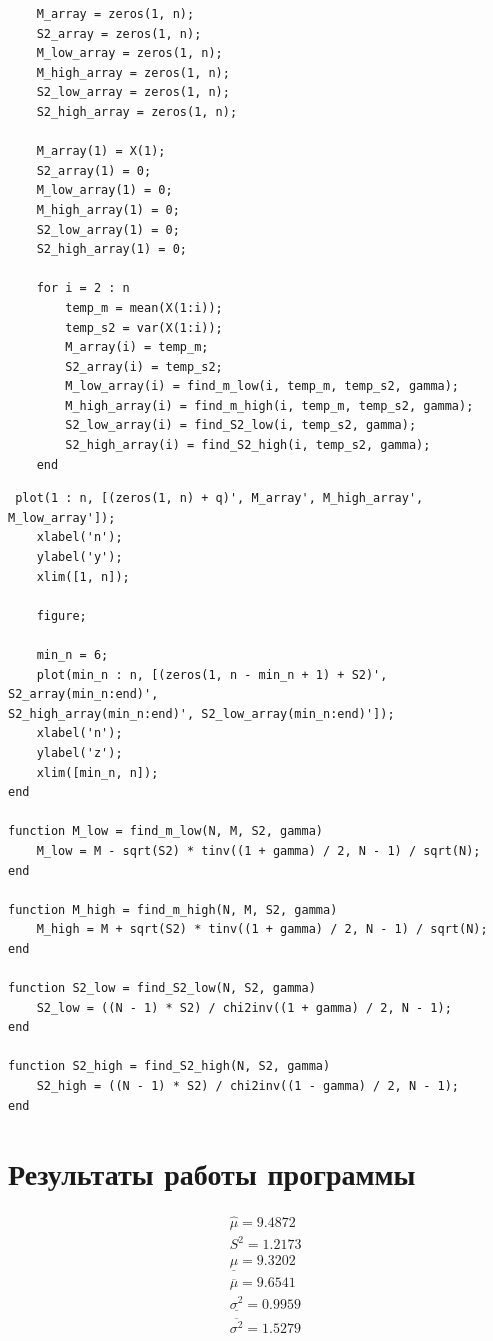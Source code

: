 \newpage
\begin{lstlisting}
    M_array = zeros(1, n);
    S2_array = zeros(1, n);
    M_low_array = zeros(1, n);
    M_high_array = zeros(1, n);
    S2_low_array = zeros(1, n);
    S2_high_array = zeros(1, n);

    M_array(1) = X(1);
    S2_array(1) = 0;
    M_low_array(1) = 0;
    M_high_array(1) = 0;
    S2_low_array(1) = 0;
    S2_high_array(1) = 0;

    for i = 2 : n
        temp_m = mean(X(1:i));
        temp_s2 = var(X(1:i));
        M_array(i) = temp_m;
        S2_array(i) = temp_s2;
        M_low_array(i) = find_m_low(i, temp_m, temp_s2, gamma);
        M_high_array(i) = find_m_high(i, temp_m, temp_s2, gamma);
        S2_low_array(i) = find_S2_low(i, temp_s2, gamma);
        S2_high_array(i) = find_S2_high(i, temp_s2, gamma);
    end
\end{lstlisting}
\newpage
\begin{lstlisting}
 plot(1 : n, [(zeros(1, n) + q)', M_array', M_high_array',
M_low_array']);
    xlabel('n');
    ylabel('y');
    xlim([1, n]);

    figure;

    min_n = 6;
    plot(min_n : n, [(zeros(1, n - min_n + 1) + S2)', S2_array(min_n:end)',
S2_high_array(min_n:end)', S2_low_array(min_n:end)']);
    xlabel('n');
    ylabel('z');
    xlim([min_n, n]);
end

function M_low = find_m_low(N, M, S2, gamma)
    M_low = M - sqrt(S2) * tinv((1 + gamma) / 2, N - 1) / sqrt(N);
end

function M_high = find_m_high(N, M, S2, gamma)
    M_high = M + sqrt(S2) * tinv((1 + gamma) / 2, N - 1) / sqrt(N);
end

function S2_low = find_S2_low(N, S2, gamma)
    S2_low = ((N - 1) * S2) / chi2inv((1 + gamma) / 2, N - 1);
end

function S2_high = find_S2_high(N, S2, gamma)
    S2_high = ((N - 1) * S2) / chi2inv((1 - gamma) / 2, N - 1);
end
\end{lstlisting}

\section{Результаты работы программы}

\begin{equation*}
    \begin{split}
        &\hat{\mu} = 9.4872\\
        &S^2 = 1.2173\\
        &\underline{\mu} = 9.3202\\
        &\overline{\mu} = 9.6541\\
        &\underline{\sigma^2} = 0.9959\\
        &\overline{\sigma^2} = 1.5279\\
    \end{split}
\end{equation*}
\newpage

